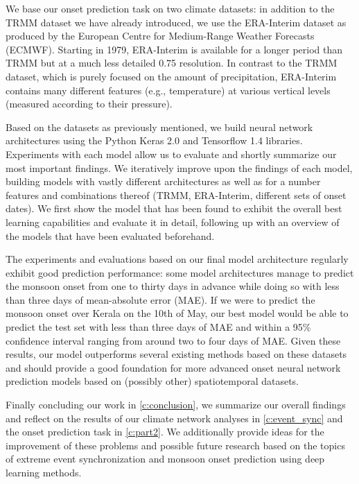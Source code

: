We base our onset prediction task on two climate datasets: in addition to the TRMM dataset we have already introduced, we use the ERA-Interim dataset as produced by the European Centre for Medium-Range Weather Forecasts (ECMWF). Starting in 1979, ERA-Interim is available for a longer period than TRMM but at a much less detailed {0.75\degree} resolution. In contrast to the TRMM dataset, which is purely focused on the amount of precipitation, ERA-Interim contains many different features (e.g., temperature) at various vertical levels (measured according to their pressure).

Based on the datasets as previously mentioned, we build neural network architectures using the Python Keras 2.0 and Tensorflow 1.4 libraries. Experiments with each model allow us to evaluate and shortly summarize our most important findings. We iteratively improve upon the findings of each model, building models with vastly different architectures as well as for a number features and combinations thereof (TRMM, ERA-Interim, different sets of onset dates). We first show the model that has been found to exhibit the overall best learning capabilities and evaluate it in detail, following up with an overview of the models that have been evaluated beforehand.

The experiments and evaluations based on our final model architecture regularly exhibit good prediction performance: some model architectures manage to predict the monsoon onset from one to thirty days in advance while doing so with less than three days of mean-absolute error (MAE). If we were to predict the monsoon onset over Kerala on the 10th of May, our best model would be able to predict the test set with less than three days of MAE and within a 95\% confidence interval ranging from around two to four days of MAE. Given these results, our model outperforms several existing methods based on these datasets and should provide a good foundation for more advanced onset neural network prediction models based on (possibly other) spatiotemporal datasets.

Finally concluding our work in \cref{c:conclusion}, we summarize our overall findings and reflect on the results of our climate network analyses in \cref{c:event_sync} and the onset prediction task in \cref{c:part2}. We additionally provide ideas for the improvement of these problems and possible future research based on the topics of extreme event synchronization and monsoon onset prediction using deep learning methods.
